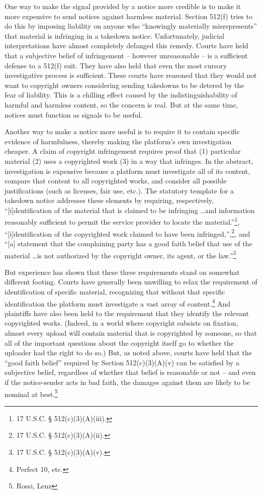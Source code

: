 One way to make the signal provided by a notice more credible is to make it more expensive to send notices against harmless material. Section 512(f) tries to do this by imposing liability on anyone who ``knowingly materially misrepresents'' that material is infringing in a takedown notice. Unfortunately, judicial interpretations have almost completely defanged this remedy. Courts have held that a subjective belief of infringement -- however unreasonable -- is a sufficient defense to a 512(f) suit. They have also held that even the most cursory investigative process is sufficient. These courts have reasoned that they would not want to copyright owners considering sending takedowns to be detered by the fear of liability. This is a chilling effect caused by the indistinguishability of harmful and harmless content, so the concern is real. But at the same time, notices must function as signals to be useful.

Another way to make a notice more useful is to require it to contain specific evidence of harmfulness, thereby making the platform's own investigation cheaper. A claim of copyright infringement requires proof that (1) particular material (2) uses a copyrighted work (3) in a way that infringes. In the abstract, investigation is expensive because a platform must investigate all of its content, compare that content to all copyrighted works, and consider all possible justifications (such as licenses, fair use, etc.).  The statutory template for a takedown notice addresses these elements by requiring, respectively, ``[i]dentification of the material that is claimed to be infringing \ldots and information reasonably sufficient to permit the service provider to locate the material.''\footnote{17 U.S.C. § 512(c)(3)(A)(iii).}, ``[i]dentification of the copyrighted work claimed to have been infringed,'',\footnote{17 U.S.C. § 512(c)(3)(A)(ii).}, and ``[a] statement that the complaining party has a good faith belief that use of the material \ldots  is not authorized by the copyright owner, its agent, or the law.''\footnote{17 U.S.C. § 512(c)(3)(A)(v).}

But experience has shown that these three requirements stand on somewhat different footing. Courts have generally been unwilling to relax the requirement of identification of specific material, recognizing that without that specific identification the platform must investigate a vast array of content.\footnote{Perfect 10, etc.} And plaintiffs have also been held to the requirement that they identify the relevant copyrighted works. (Indeed, in a world where copyright subsists on fixation, almost every upload will contain material that is copyrighted by someone, so that all of the important questions about the copyright itself go to whether the uploader had the right to do so.) But, as noted above, courts have held that the ``good faith belief'' required by Section 512(c)(3)(A)(v) can be satisfied by a subjective belief, regardless of whether that belief is reasonable or not -- and even if the notice-sender acts in bad faith, the damages against them are likely to be nominal at best.\footnote{Rossi, Lenz} 

